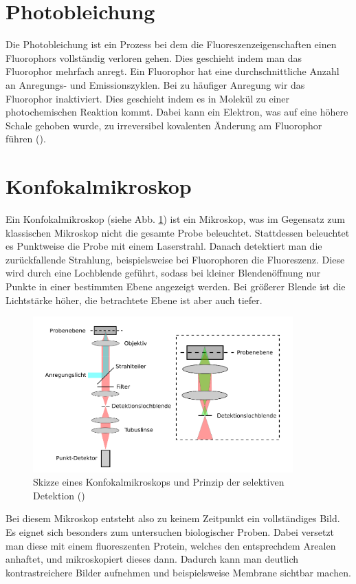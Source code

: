 \section{Photobleichung}

Die Photobleichung ist ein Prozess bei dem die Fluoreszenzeigenschaften einen Fluorophors vollständig verloren gehen. 
Dies geschieht indem man das Fluorophor mehrfach anregt. Ein Fluorophor hat eine durchschnittliche Anzahl an Anregungs- und Emissionszyklen. 
Bei zu häufiger Anregung wir das Fluorophor inaktiviert. Dies geschieht indem es in Molekül zu einer photochemischen 
Reaktion kommt. Dabei kann ein Elektron, was auf eine höhere Schale gehoben wurde, zu irreversibel kovalenten Änderung am 
Fluorophor führen (\cite{Song1995}).

\section{Konfokalmikroskop}

Ein Konfokalmikroskop (siehe Abb. \ref{bild:Konfokalmikroskop}) ist ein Mikroskop, was im Gegensatz zum klassischen Mikroskop nicht die gesamte Probe beleuchtet. 
Stattdessen beleuchtet es Punktweise die Probe mit einem Laserstrahl. Danach detektiert man die zurückfallende Strahlung, 
beispielsweise bei Fluorophoren die Fluoreszenz. Diese wird durch eine Lochblende geführt, sodass bei kleiner 
Blendenöffnung nur Punkte in einer bestimmten Ebene angezeigt werden. Bei größerer Blende ist die Lichtstärke höher, die betrachtete Ebene ist aber auch tiefer. 

\begin{figure}[ht]
    \centering
    \includegraphics[width = 10cm]{Bilder/Grundlagen/Konfokalmikroskop.png}
    \caption{Skizze eines Konfokalmikroskops und Prinzip der selektiven Detektion (\cite{FRETSkript})}
    \label{bild:Konfokalmikroskop}
\end{figure}

Bei diesem Mikroskop entsteht also zu keinem Zeitpunkt ein vollständiges Bild. Es eignet sich besonders zum untersuchen biologischer Proben. 
Dabei versetzt man diese mit einem fluoreszenten Protein, welches den entsprechdem Arealen anhaftet, und mikroskopiert dieses dann. Dadurch kann man 
deutlich kontrastreichere Bilder aufnehmen und beispielsweise Membrane sichtbar machen. 